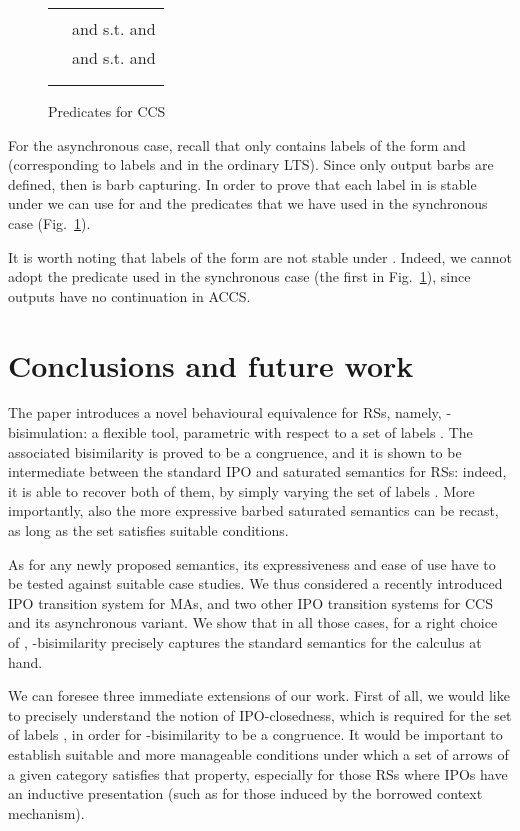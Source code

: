 \documentclass[copyright,creativecommons]{eptcs}
\newcommand{\<}{\langle}
\renewcommand{\>}{\rangle}
\begin{document}
\begin{figure}
\begin{tabular}{p{3 cm} p{12.1 cm}}
\hline
\\
 &  and   s.t.
   and  \\
   &  and   s.t.
   and  \\
   &  \\ \\
\hline
\end{tabular}
\caption{Predicates for CCS}\label{fig:arrayCCS}
\end{figure}

For the asynchronous case, recall that  only contains labels of
the form  and  (corresponding to labels  and
 in the ordinary LTS). Since only output barbs
 are defined, then  is barb capturing. In
order to prove that each label in  is stable under  we
can use for  and  the predicates that we have used in
the synchronous case (Fig.~\ref{fig:arrayCCS}).

It is worth noting that labels of the form  are not
stable under . Indeed, we cannot adopt the predicate used in
the synchronous case (the first in Fig.~\ref{fig:arrayCCS}), since
outputs have no continuation in ACCS.



\section{Conclusions and future work}
\label{sec:Concl}

The paper introduces a novel behavioural equivalence for RSs, namely,
-bisimulation: a flexible tool, parametric with respect to a set of
labels . The associated bisimilarity is proved to be a
congruence, and it is shown to be intermediate between the standard
IPO and saturated semantics for RSs: indeed, it is able to recover
both of them, by simply varying the set of labels . More
importantly, also the more expressive barbed saturated semantics can
be recast, as long as the set  satisfies suitable conditions.

As for any newly proposed semantics, its expressiveness and ease of
use have to be tested against suitable case studies. We thus
considered a recently introduced IPO transition system for
MAs, and two other IPO transition systems for CCS and its asynchronous
variant. We show that in all those cases, for a right choice of ,
-bisimilarity precisely captures the standard semantics for the calculus at hand.

We can foresee three immediate extensions of our work. First of all,
we would like to precisely understand the notion of IPO-closedness,
which is required for the set of labels , in order for
-bisimilarity to be a congruence. It would be important to
establish suitable and more manageable conditions under which a set of
arrows of a given category satisfies that property, especially for
those RSs where IPOs have an inductive presentation (such as for those
induced by the borrowed context mechanism).
\end{document}
